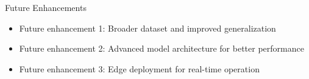 
\begin{frame}{Future Enhancements}
    \begin{itemize}
        \item Future enhancement 1: Broader dataset and improved generalization
        \item Future enhancement 2: Advanced model architecture for better performance
        \item Future enhancement 3: Edge deployment for real-time operation
    \end{itemize}
\end{frame}
